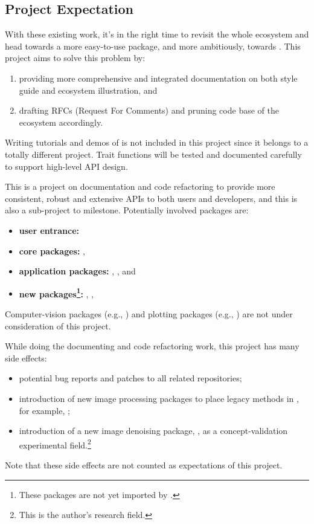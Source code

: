 \subsection*{Project Expectation}
With these existing work, it's in the right time to revisit the whole \images{} ecosystem and head towards a more easy-to-use \images{} package, and more ambitiously, towards \images{} . This project aims to solve this problem by:
\begin{enumerate}
    \item providing more comprehensive and integrated documentation on both style guide and ecosystem illustration, and
    \item drafting RFCs (Request For Comments) and pruning code base of the ecosystem accordingly.
\end{enumerate}
Writing tutorials and demos of \images{} is not included in this project since it belongs to a totally different project. Trait functions will be tested and documented carefully to support high-level API design.

This is a project on documentation and code refactoring to provide more consistent, robust and extensive APIs to both users and developers, and this is also a sub-project to \images{}  milestone. Potentially involved packages are:
\begin{itemize}
    \item \textbf{user entrance:} \repoimages
    \item \textbf{core packages:} \repoimagecore, \repoimageaxes
    \item \textbf{application packages:} \repoimagemorphology, \repoimagetransformations, \repoimagedistance \repoimagemetadata and \repoimagefiltering
    \item \textbf{new packages\footnote{These packages are not yet imported by \images.}:} \repoimagebinarization, \repohistogramthresholding, \repoimageinpainting
\end{itemize}
Computer-vision packages (e.g., \repoimagetracking) and plotting packages (e.g., \repoimageview) are not under consideration of this project.\par

While doing the documenting and code refactoring work, this project has many side effects:
\begin{itemize}
    \item potential bug reports and patches to all related \langjulia repositories;
    \item introduction of new image processing packages to place legacy methods in \images, for example, ;
    \item introduction of a new image denoising package, \repoimagenoise, as a concept-validation experimental field.\footnote{This is the author's research field.}
\end{itemize}
Note that these side effects are not counted as expectations of this project.\par

